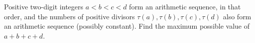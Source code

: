 Positive two-digit integers $a<b<c<d$ form an arithmetic sequence, in that order, and the numbers of positive divisors $\tau(a),\tau(b),\tau(c),\tau(d)$ also form an arithmetic sequence (possibly constant). Find the maximum possible value of $a+b+c+d$.
